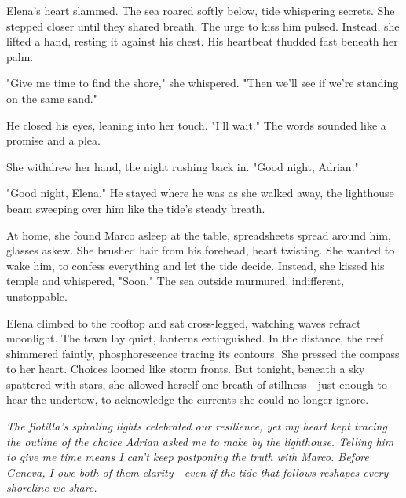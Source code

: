 Elena's heart slammed. The sea roared softly below, tide whispering secrets. She stepped closer until they shared breath. The urge to kiss him pulsed. Instead, she lifted a hand, resting it against his chest. His heartbeat thudded fast beneath her palm.

"Give me time to find the shore," she whispered. "Then we'll see if we're standing on the same sand."

He closed his eyes, leaning into her touch. "I'll wait." The words sounded like a promise and a plea.

She withdrew her hand, the night rushing back in. "Good night, Adrian."

"Good night, Elena." He stayed where he was as she walked away, the lighthouse beam sweeping over him like the tide's steady breath.

At home, she found Marco asleep at the table, spreadsheets spread around him, glasses askew. She brushed hair from his forehead, heart twisting. She wanted to wake him, to confess everything and let the tide decide. Instead, she kissed his temple and whispered, "Soon." The sea outside murmured, indifferent, unstoppable.

Elena climbed to the rooftop and sat cross-legged, watching waves refract moonlight. The town lay quiet, lanterns extinguished. In the distance, the reef shimmered faintly, phosphorescence tracing its contours. She pressed the compass to her heart. Choices loomed like storm fronts. But tonight, beneath a sky spattered with stars, she allowed herself one breath of stillness—just enough to hear the undertow, to acknowledge the currents she could no longer ignore.


\noindent\textit{The flotilla's spiraling lights celebrated our resilience, yet my heart kept tracing the outline of the choice Adrian asked me to make by the lighthouse. Telling him to give me time means I can't keep postponing the truth with Marco. Before Geneva, I owe both of them clarity—even if the tide that follows reshapes every shoreline we share.}
